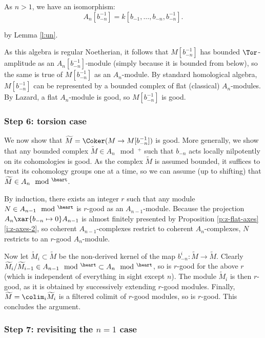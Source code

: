 As $n>1$, we have an isomorphism:
%
\[
A_n[b_{-n}^{-1}] = k[b_{-1},\ldots,b_{-n},b_{-n}^{-1}].
\]

 by Lemma \ref{l:un}.

As this algebra is regular Noetherian, it follows that
$M[b_{-n}^{-1}]$ has bounded $\Tor$-amplitude as an
$A_n[b_{-n}^{-1}]$-module (simply because it is bounded from below),
so the same is true of $M[b_{-n}^{-1}]$ as an $A_n$-module.
By standard homological algebra, $M[b_{-n}^{-1}]$ can be represented
by a bounded complex of flat (classical) $A_n$-modules.
By Lazard, a flat $A_n$-module is good, so $M[b_{-n}^{-1}]$ is good.

\subsubsection{Step 6: torsion case}

We now show that $\widetilde{M} = \Coker(M \to M[b_{-n}^{-1}])$ is good.
More generally, we show that any bounded complex
$\widetilde{M} \in A_n\mod^+$ such that $b_{-n}$ acts locally nilpotently on
its cohomologies is good. As the complex $\widetilde{M}$ is assumed bounded,
it suffices to treat its cohomology groups one at a time, so
we can assume (up to shifting) that $\widetilde{M} \in A_n\mod^{\heart}$.

By induction, there exists an integer $r$ such that any module
$N \in A_{n-1}\mod^{\heart}$ is $r$-good as an $A_{n-1}$-module.
Because the projection $A_n \xar{b_{-n} \mapsto 0} A_{n-1}$ is
almost finitely presented by Proposition \ref{p:z-flat-axes} \eqref{i:z-axes-2},
so coherent $A_{n-1}$-complexes restrict to coherent $A_n$-complexes,
$N$ restricts to an $r$-good $A_n$-module.

Now let $\widetilde{M}_i \subset \widetilde{M}$ be the
non-derived kernel of the map $b_{-n}^i:\widetilde{M} \to \widetilde{M}$.
Clearly $\widetilde{M}_i/\widetilde{M}_{i-1} \in A_{n-1}\mod^{\heart} \subset
A_n\mod^{\heart}$, so is $r$-good for the above $r$ (which is independent
of everything in sight except $n$). The module
$\widetilde{M}_i$ is then $r$-good, as it is obtained by successively extending
$r$-good modules. Finally, $\widetilde{M} = \colim_i \widetilde{M}_i$ is
a filtered colimit of $r$-good modules, so is $r$-good. This concludes the argument.

\subsubsection{Step 7: revisiting the $n = 1$ case}\label{sss:semi-coh-7}

